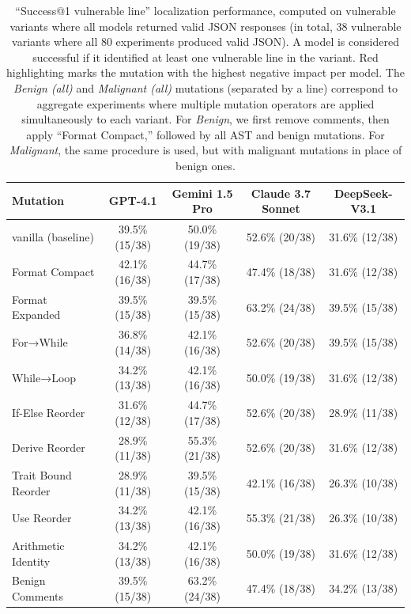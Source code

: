 \begin{table}[htbp]
\centering
\small
\caption{%
``Success@1 vulnerable line'' localization performance, computed on vulnerable variants where all models returned valid JSON responses (in total, 38 vulnerable variants where all 80 experiments produced valid JSON). 
A model is considered successful if it identified at least one vulnerable line in the variant. 
Red highlighting marks the mutation with the highest negative impact per model. 
The \emph{Benign (all)} and \emph{Malignant (all)} mutations (separated by a line) correspond to aggregate experiments where multiple mutation operators are applied simultaneously to each variant. 
For \emph{Benign}, we first remove comments, then apply ``Format Compact,'' followed by all AST and benign mutations. 
For \emph{Malignant}, the same procedure is used, but with malignant mutations in place of benign ones.
}
\label{tab:mutation_impact}
\begin{tabular}{lcccc}
\toprule
\textbf{Mutation} & \textbf{GPT-4.1} & \textbf{Gemini 1.5 Pro} & \textbf{Claude 3.7 Sonnet} & \textbf{DeepSeek-V3.1} \\
\midrule
vanilla (baseline) & 39.5\% (15/38) & 50.0\% (19/38) & 52.6\% (20/38) & 31.6\% (12/38) \\
\addlinespace[4pt]
Format Compact & 42.1\% (16/38) & 44.7\% (17/38) & 47.4\% (18/38) & 31.6\% (12/38) \\
Format Expanded & 39.5\% (15/38) & 39.5\% (15/38) & 63.2\% (24/38) & 39.5\% (15/38) \\
\addlinespace[2pt]
For→While & 36.8\% (14/38) & 42.1\% (16/38) & 52.6\% (20/38) & 39.5\% (15/38) \\
While→Loop & 34.2\% (13/38) & 42.1\% (16/38) & 50.0\% (19/38) & 31.6\% (12/38) \\
If-Else Reorder & 31.6\% (12/38) & 44.7\% (17/38) & 52.6\% (20/38) & 28.9\% (11/38) \\
Derive Reorder & 28.9\% (11/38) & 55.3\% (21/38) & 52.6\% (20/38) & 31.6\% (12/38) \\
Trait Bound Reorder & 28.9\% (11/38) & 39.5\% (15/38) & 42.1\% (16/38) & 26.3\% (10/38) \\
Use Reorder & 34.2\% (13/38) & 42.1\% (16/38) & 55.3\% (21/38) & 26.3\% (10/38) \\
Arithmetic Identity & 34.2\% (13/38) & 42.1\% (16/38) & 50.0\% (19/38) & 31.6\% (12/38) \\
\addlinespace[4pt]
Benign Comments & 39.5\% (15/38) & 63.2\% (24/38) & 47.4\% (18/38) & 34.2\% (13/38) \\

\end{tabular}
\end{table}
